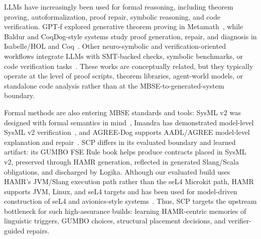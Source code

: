 \documentclass[conference]{IEEEtran}
\begin{document}
LLMs have increasingly been used for formal reasoning, including theorem proving, autoformalization, proof repair, symbolic reasoning, and code verification. GPT-f explored generative theorem proving in Metamath~\cite{polu2020generative}, while Baldur and CoqDog-style systems study proof generation, repair, and diagnosis in Isabelle/HOL and Coq~\cite{first2023baldur,CoqDog}. Other neuro-symbolic and verification-oriented workflows integrate LLMs with SMT-backed checks, symbolic benchmarks, or code verification tasks~\cite{DBLP:conf/popl/SwamyHKRDFBFSKZ16,aws_bedrock_ar,mirzadeh2025gsmsymbolic}. 
%
These works are conceptually related, but they typically operate at the level of proof scripts, theorem libraries, agent-world models, or standalone code analysis rather than at the MBSE-to-generated-system boundary.

Formal methods are also entering MBSE standards and tools: SysML v2 was designed with formal semantics in mind~\cite{sysmlv2}, Imandra has demonstrated model-level SysML v2 verification~\cite{imandra_sysml}, and AGREE-Dog supports AADL/AGREE model-level explanation and repair~\cite{agreedog_tahat2025,feiler-aadl}. SCP differs in its evaluated boundary and learned artifact: its GUMBO FSE Rule book helps produce contracts placed in SysML v2, preserved through HAMR generation, reflected in generated Slang/Scala obligations, and discharged by Logika. Although our evaluated build uses HAMR's JVM/Slang execution path rather than the seL4 Microkit path, HAMR supports JVM, Linux, and seL4 targets and has been used for model-driven construction of seL4 and avionics-style systems~\cite{hardin2025dasc}. Thus, SCP targets the upstream bottleneck for such high-assurance builds: learning HAMR-centric memories of linguistic triggers, GUMBO choices, structural placement decisions, and verifier-guided repairs.

\end{document}
